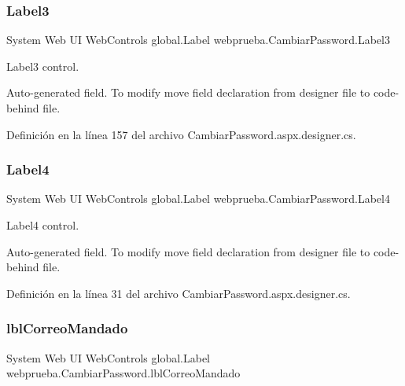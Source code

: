 \subsubsection{\texorpdfstring{Label3}{Label3}}
{\footnotesize\ttfamily System Web UI Web\+Controls global.\+Label webprueba.\+Cambiar\+Password.\+Label3\hspace{0.3cm}{\ttfamily [protected]}}



Label3 control. 

Auto-\/generated field. To modify move field declaration from designer file to code-\/behind file. 

Definición en la línea 157 del archivo Cambiar\+Password.\+aspx.\+designer.\+cs.

\mbox{\label{classwebprueba_1_1_cambiar_password_aab5db88116d7c2167c3d83083917cf65}} 
\subsubsection{\texorpdfstring{Label4}{Label4}}
{\footnotesize\ttfamily System Web UI Web\+Controls global.\+Label webprueba.\+Cambiar\+Password.\+Label4\hspace{0.3cm}{\ttfamily [protected]}}



Label4 control. 

Auto-\/generated field. To modify move field declaration from designer file to code-\/behind file. 

Definición en la línea 31 del archivo Cambiar\+Password.\+aspx.\+designer.\+cs.

\mbox{\label{classwebprueba_1_1_cambiar_password_a15e8380ba026f9b5caafa4a32cbf1514}} 
\subsubsection{\texorpdfstring{lblCorreoMandado}{lblCorreoMandado}}
{\footnotesize\ttfamily System Web UI Web\+Controls global.\+Label webprueba.\+Cambiar\+Password.\+lbl\+Correo\+Mandado\hspace{0.3cm}{\ttfamily [protected]}}



